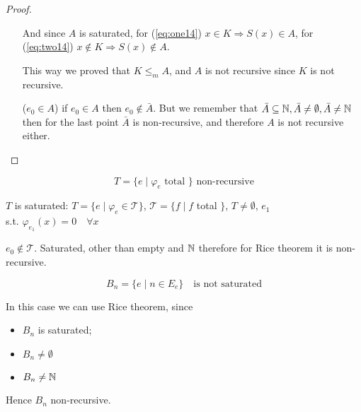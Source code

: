 \begin{proof}
\begin{itemize}
    And since $A$ is saturated, for (\ref{eq:one14})
    $x \in K \Rightarrow S(x) \in A$, for (\ref{eq:two14})
    $x\notin K \Rightarrow S(x) \notin A$.

    This way we proved that $K \leq_m A$, and $A$ is not recursive 
    since $K$ is not recursive.
    
  \item[($e_0 \in A$)] if $ e_0 \in A $ then $ e_0 \not \in \bar{A}
    $. But we remember that
    $ \bar{A} \subseteq \mathbb{N}, \bar{A} \neq \emptyset, \bar{A} \neq
    \mathbb{N} $ then for the last point $ \bar{A} $ is non-recursive, and
    therefore $A$ is not recursive either.
  \end{itemize}
\end{proof}

\begin{example}
  \[ T = \{e \mid \varphi_e \mbox{ total } \} \mbox{ non-recursive} \]

  $T$ is saturated: $ T = \{e \mid \varphi_e \in \mathcal{T} \} $, $
  \mathcal{T} = \{f \mid f $ total $ \} $, $ T\neq\emptyset $, $ e_1 $\\
  s.t. $ \varphi_{e_1}(x) = 0 \quad \forall x $

  $ e_0 \notin \mathcal{T} $. Saturated, other than empty and $ \mathbb{N} $
  therefore for Rice theorem it is non-recursive.
\end{example}

\begin{example}
  \[ B_n = \{e \mid n \in E_e \} \quad \mbox{is not saturated} \]

  In this case we can use Rice theorem, since
  \begin{itemize}
  \item $B_n$ is saturated;
  \item $B_n \neq \emptyset$
  \item $B_n \neq \mathbb{N}$ 
  \end{itemize}

  Hence $ B_n $ non-recursive.
\end{example}